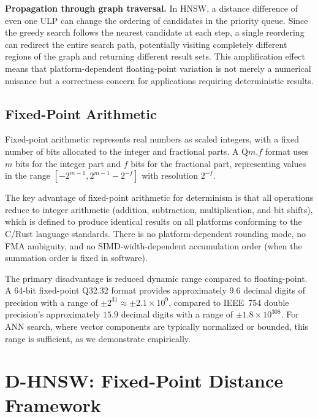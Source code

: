 \documentclass[10pt,journal,compsoc]{IEEEtran}
\newcommand{\hnsw}{\textsc{HNSW}}
\begin{document}
\textbf{Propagation through graph traversal.} In \hnsw{}, a distance difference of even one ULP can change the ordering of candidates in the priority queue. Since the greedy search follows the nearest candidate at each step, a single reordering can redirect the entire search path, potentially visiting completely different regions of the graph and returning different result sets. This amplification effect means that platform-dependent floating-point variation is not merely a numerical nuisance but a correctness concern for applications requiring deterministic results.

\subsection{Fixed-Point Arithmetic}

Fixed-point arithmetic represents real numbers as scaled integers, with a fixed number of bits allocated to the integer and fractional parts. A Q$m$.$f$ format uses $m$ bits for the integer part and $f$ bits for the fractional part, representing values in the range $[-2^{m-1}, 2^{m-1} - 2^{-f}]$ with resolution $2^{-f}$.

The key advantage of fixed-point arithmetic for determinism is that all operations reduce to integer arithmetic (addition, subtraction, multiplication, and bit shifts), which is defined to produce identical results on all platforms conforming to the C/Rust language standards. There is no platform-dependent rounding mode, no FMA ambiguity, and no SIMD-width-dependent accumulation order (when the summation order is fixed in software).

The primary disadvantage is reduced dynamic range compared to floating-point. A 64-bit fixed-point Q32.32 format provides approximately $9.6$ decimal digits of precision with a range of $\pm 2^{31} \approx \pm 2.1 \times 10^9$, compared to IEEE~754 double precision's approximately $15.9$ decimal digits with a range of $\pm 1.8 \times 10^{308}$. For ANN search, where vector components are typically normalized or bounded, this range is sufficient, as we demonstrate empirically.


\section{D-HNSW: Fixed-Point Distance Framework}
\label{sec:method}
\end{document}
